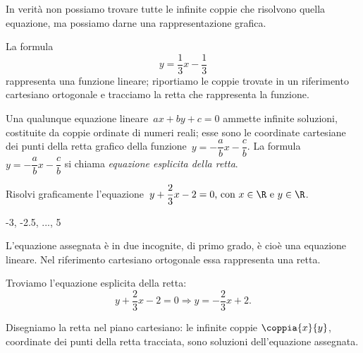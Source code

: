 \begin{esempio}{}{}
In verità non possiamo trovare tutte le infinite coppie che risolvono
quella equazione, ma possiamo darne una rappresentazione grafica.

La formula \[y=\frac{1}{3}x-\frac{1}{3}\] rappresenta una funzione
lineare; riportiamo le coppie trovate in un riferimento cartesiano
ortogonale e tracciamo la retta che rappresenta la funzione.

Una qualunque equazione lineare~\(ax+by+c=0\) ammette infinite
soluzioni, costituite da coppie ordinate di numeri reali; esse sono le
coordinate cartesiane dei punti della retta grafico della 
funzione~\(y=-{\dfrac{a}{b}}x-\dfrac{c}{b}\).
La formula~\(y=-{\dfrac{a}{b}}x-\dfrac{c}{b}\) si chiama \emph{equazione 
esplicita 
della retta}.
\end{esempio}

\newpage %

\begin{esempio}{}{}
 Risolvi graficamente l'equazione~\(y+\dfrac{2}{3}x-2=0\text{, con } 
x\in\R\text{ e }y\in\R\).
\end{esempio}

                    {-3, -2.5, ..., 5}
% 

L'equazione assegnata è in due incognite, di primo
grado, è cioè una equazione lineare. Nel riferimento cartesiano
ortogonale essa rappresenta una retta.

Troviamo l'equazione esplicita della retta:
\[y+\frac{2}{3}x-2=0\Rightarrow y=-{\frac{2}{3}}x+2.\]

% 

Disegniamo la retta nel piano cartesiano: le infinite coppie
\(\coppia{x}{y}\), 
coordinate dei punti della retta tracciata, sono soluzioni
dell'equazione assegnata.


